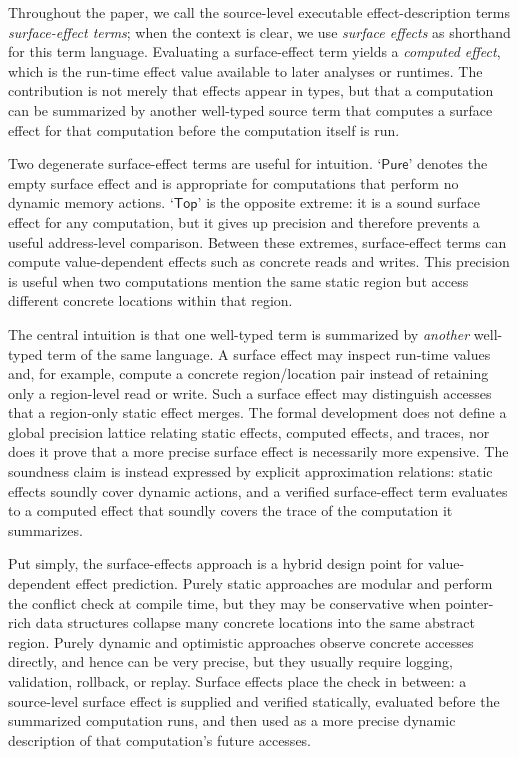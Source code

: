 \documentclass[10pt,a4paper]{article}
\newcommand{\Top}{\mathsf{Top}}
\newcommand{\Pure}{\mathsf{Pure}}
\begin{document}
Throughout the paper, we call the source-level executable effect-description terms
\emph{surface-effect terms}; when the context is clear, we use \emph{surface
effects} as shorthand for this term language. Evaluating a surface-effect term
yields a \emph{computed effect}, which is the run-time effect value available
to later analyses or runtimes. The contribution is not merely that effects
appear in types, but that a computation can be summarized by another well-typed
source term that computes a surface effect for that computation before the
computation itself is run.

Two degenerate surface-effect terms are useful for intuition. `$\Pure$' denotes
the empty surface effect and is appropriate for computations that perform no
dynamic memory actions. `$\Top$' is the opposite extreme: it is a sound surface
effect for any
computation, but it gives up precision and therefore prevents a useful
address-level comparison. Between these extremes, surface-effect terms
can compute value-dependent effects such as concrete reads and writes. This
precision is useful when two computations mention the same static region but
access different concrete locations within that region.

The central intuition is that one well-typed term is summarized by \emph{another}
well-typed term of the same language. A surface effect may inspect run-time
values and, for example, compute a concrete region/location pair instead of
retaining only a region-level read or write. Such a surface effect may
distinguish accesses that a
region-only static effect merges. The formal development does not define a
global precision lattice relating static effects, computed effects, and traces,
nor does it prove that a more precise surface effect is necessarily more
expensive. The
soundness claim is instead expressed by explicit approximation relations:
static effects soundly cover dynamic actions, and a verified surface-effect term
evaluates to a computed effect that soundly covers the trace of the computation
it summarizes.

Put simply, the surface-effects approach is a hybrid design point for
value-dependent effect prediction. Purely static approaches are modular and
perform the conflict check at compile time, but they may be conservative when
pointer-rich data structures collapse many concrete locations into the same
abstract region. Purely dynamic and optimistic approaches observe concrete
accesses directly, and hence can be very precise, but they usually require
logging, validation, rollback, or replay. Surface effects place the check in
between: a source-level surface effect is supplied and verified statically, evaluated
before the summarized computation runs, and then used as a more precise dynamic
description of that computation's future accesses.
\end{document}
